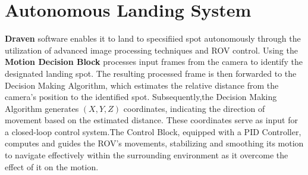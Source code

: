 \documentclass{article}
\begin{document}
\section{Autonomous Landing System}
\textbf{Draven} software enables it to land to specsifiied spot autonomously through the utilization of advanced image processing techniques and ROV control. 
Using the \textbf{Motion Decision Block} processes input frames from the camera to identify the designated landing spot. The resulting processed frame is then forwarded to the Decision Making Algorithm, which estimates the relative distance from the camera's position to the identified spot. 
Subsequently,the Decision Making Algorithm generates $(X,Y,Z)$ coordinates, indicating the direction of movement based on the estimated distance. These coordinates serve as input for a closed-loop control system.The Control Block, equipped with a PID Controller, computes and guides the ROV's movements, stabilizing and smoothing its motion to navigate effectively within the surrounding environment as it overcome the effect of it on the motion.
\end{document}
